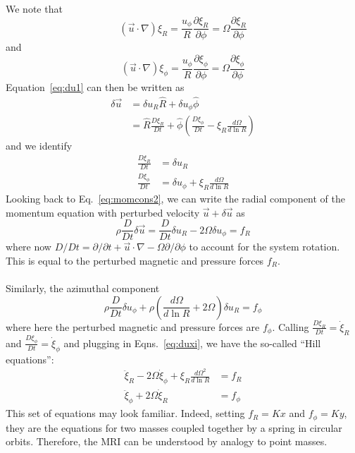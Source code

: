 We note that 
\begin{equation*}
(\vec u\cdot\nabla)\xi_R=\frac{u_\phi}{R}\frac{\partial\xi_R}{\partial \phi}=\Omega\frac{\partial\xi_R}{\partial \phi}
\end{equation*}
and
\begin{equation*}
(\vec u\cdot\nabla)\xi_\phi=\frac{u_\phi}{R}\frac{\partial\xi_\phi}{\partial \phi}=\Omega\frac{\partial\xi_\phi}{\partial\phi}
\end{equation*}
Equation~\ref{eq:du1} can then be written as
\begin{align*}
\delta\vec u&=\delta u_R\hat R+\delta u_\phi\hat \phi\\
&=\hat R \frac{D\xi_R}{Dt}+\hat\phi\left(\frac{D\xi_\phi}{Dt}-\xi_R\frac{d\Omega}{d\ln R}\right)
\end{align*}
and we identify
\begin{align}
\frac{D\xi_R}{Dt}&=\delta u_R\nonumber\\
\frac{D\xi_\phi}{Dt}&=\delta u_\phi+\xi_R \frac{d\Omega}{d\ln R} \label{eq:duxi}
\end{align}
Looking back to Eq.~\ref{eq:momcons2}, we can write the radial component of the momentum equation with perturbed velocity $\vec u+\delta\vec u$ as
\begin{equation*}
\rho\frac{D}{Dt}\delta\vec u=\frac D{Dt}\delta u_R-2\Omega\delta u_\phi=f_R
\end{equation*}
where now $D/Dt=\partial/\partial t+\vec u\cdot\nabla -\Omega\partial/\partial\phi$ to account for the system rotation. This is equal to the perturbed magnetic and pressure forces $f_R$.\\
\\
Similarly, the azimuthal component
\begin{equation*}
\rho\frac{D}{Dt}\delta u_\phi+\rho\left(\frac{d\Omega}{d\ln R}+2\Omega\right)\delta u_R=f_\phi
\end{equation*}
where here the perturbed magnetic and pressure forces are $f_\phi$. Calling $\frac{D\xi_R}{Dt}=\dot\xi_R$ and $\frac{D\xi_\phi}{Dt}=\dot\xi_\phi$ and plugging in Eqns.~\ref{eq:duxi}, we have the so-called ``Hill equations'':
\begin{align}
\ddot\xi_R-2\Omega\dot\xi_\phi +\xi_R\frac{d\Omega^2}{d\ln R}&=f_R\label{eq:hill1}\\
\ddot\xi_\phi+2\Omega\dot\xi_R &=f_\phi \label{eq:hill2}
\end{align}
This set of equations may look familiar. Indeed, setting $f_R=Kx$ and $f_\phi=Ky$, they are the equations for two masses coupled together by a spring in circular orbits. Therefore, the MRI can be understood by analogy to point masses.\\

